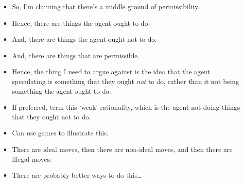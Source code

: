 \documentclass[10pt]{article}
\begin{document}
\begin{itemize}
\item So, I'm claiming that there's a middle ground of permissibility.
\item Hence, there are things the agent ought to do.
\item And, there are things the agent ought not to do.
\item And, there are things that are permissible.
\item Hence, the thing I need to argue against is the idea that the agent speculating is something that they ought \emph{not} to do, rather than it not being something the agent ought to do.
\end{itemize}

\begin{itemize}
\item If preferred, term this `weak' rationality, which is the agent not doing things that they ought not to do.
\item Can use games to illustrate this.
\item There are ideal moves, then there are non-ideal moves, and then there are illegal moves.
\item There are probably better ways to do this\dots
\end{itemize}


\newpage

\printbibliography
\end{document}
